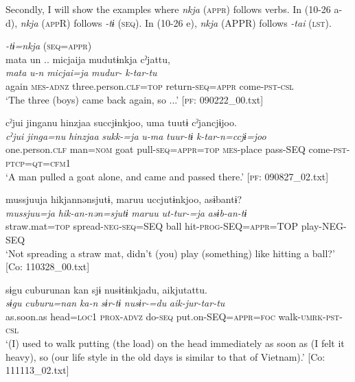   Secondly, I will show the examples where \textit{nkja} (\textsc{appr}) follows verbs. In (10-26 a-d), \textit{nkja} (\textsc{app}R) follows \textit{{}-tɨ} (\textsc{seq}). In (10-26 e), \textit{nkja} (APPR) follows \textit{-tai} (\textsc{lst}).

\ea\label{ex:10.26}   
 \begin{xlist}
 \exi{} \textit{{}-tɨ=nkja} (\textsc{seq}=\textsc{appr})\\
  \ex  %
      \glll    mata  un ..  micjaija  mudutɨnkja  cˀjattu,\\
      \textit{mata}  \textit{u-n} {} \textit{micjai=ja}  \textit{mudur-}  \textit{k-tar-tu}\\
      again  \textsc{mes}-\textsc{adnz} {} three.person.\textsc{clf}=\textsc{top}  return-\textsc{seq}=\textsc{appr}  come-\textsc{pst}{}-\textsc{csl}\\
      \glt       ‘The three (boys) came back again, so ...’ [\textsc{pf}: 090222\_00.txt]

  \ex  %
      \glll    cˀjui  jinganu  hinzjaa  succjɨnkjoo,  uma   tuutɨ  cˀjancjɨjoo.\\
      \textit{cˀjui}  \textit{jinga=nu}  \textit{hinzjaa}  \textit{sukk-=ja}  \textit{u-ma}  \textit{tuur-tɨ}  \textit{k-tar-n=ccjɨ=joo}\\
      one.person.\textsc{clf}  man=\textsc{nom}  goat  pull-\textsc{seq}=\textsc{appr}=\textsc{top}  \textsc{mes}-place  pass-SEQ  come-\textsc{pst}-\textsc{ptcp}=\textsc{qt}=\textsc{cfm}1\\
      \glt       ‘A man pulled a goat alone, and came and passed there.’ [\textsc{pf}: 090827\_02.txt]

  \ex  %
      \glll    mussjuuja  hikjannənsjutɨ,  maruu  uccjutɨnkjoo,   asɨbantɨ?      \\
      \textit{mussjuu=ja}  \textit{hik-an-nən=sjutɨ}  \textit{maruu}  \textit{ut-tur-=ja} \textit{asɨb-an-tɨ}\\
      straw.mat=\textsc{top}  spread-\textsc{neg}-\textsc{seq}=SEQ  ball  hit-\textsc{prog}-SEQ=\textsc{appr}=TOP  play-NEG-SEQ      \\
      \glt       ‘Not spreading a straw mat, didn’t (you) play (something) like hitting a ball?’ [Co: 110328\_00.txt]

  \ex  %
      \glll    sɨgu  cuburunan  kan  sjɨ  nusɨtɨnkjadu, aikjutattu.\\
      \textit{sɨgu}  \textit{cuburu=nan}  \textit{ka-n}  \textit{sɨr-tɨ}  \textit{nusɨr-=du}  \textit{aik-jur-tar-tu}\\
      as.soon.as  head=\textsc{loc}1  \textsc{prox}-\textsc{advz}  do-\textsc{seq}  put.on-SEQ=\textsc{appr}=\textsc{foc}   walk-\textsc{umrk}-\textsc{pst}-\textsc{csl}\\
      \glt       ‘(I) used to walk putting (the load) on the head immediately as soon as (I felt it heavy), so (our life style in the old days is similar to that of Vietnam).’ [Co: 111113\_02.txt]


\end{xlist}
